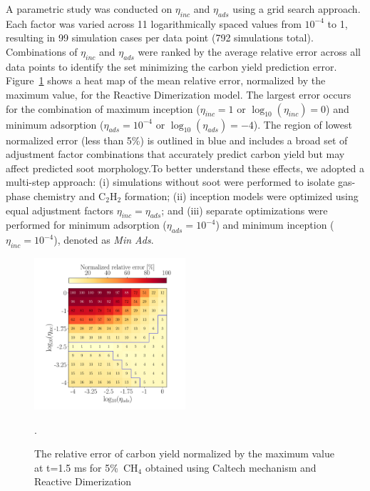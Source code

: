A parametric study was conducted on $\eta_{inc}$ and $\eta_{ads}$ using a grid search approach. Each factor was varied across 11 logarithmically spaced values from $10^{-4}$ to 1, resulting in 99 simulation cases per data point (792 simulations total). Combinations of $\eta_{inc}$ and $\eta_{ads}$ were ranked by the average relative error across all data points to identify the set minimizing the carbon yield prediction error. Figure~\ref{fig:shockagof_yielderror_cpr} shows a heat map of the mean relative error, normalized by the maximum value, for the Reactive Dimerization model. The largest error occurs for the combination of maximum inception ($\eta_{inc} = 1$ or $\log_{10}(\eta_{inc}) = 0$) and minimum adsorption ($\eta_{ads} = 10^{-4}$ or $\log_{10}(\eta_{ads}) = -4$). The region of lowest normalized error (less than 5\%) is outlined in blue and includes a broad set of adjustment factor combinations that accurately predict carbon yield but may affect predicted soot morphology.To better understand these effects, we adopted a multi-step approach: (i) simulations without soot were performed to isolate gas-phase chemistry and $\mathrm{C_2H_2}$ formation; (ii) inception models were optimized using equal adjustment factors $\eta_{inc} = \eta_{ads}$; and (iii) separate optimizations were performed for minimum adsorption ($\eta_{ads} = 10^{-4}$) and minimum inception ($\eta_{inc} = 10^{-4}$), denoted as \textit{Min Ads}.

\begin{figure}[H]
	\centering
	\includegraphics[width=0.5\textwidth]{Figures/Results/Shocktube/Agafonov2016_cpr/5CH4_norm_yield_error_readim.pdf}
	\caption{The relative error of carbon yield normalized by the maximum value at t=1.5 ms for 5\%~$\mathrm{CH_4}$ obtained using Caltech mechanism and Reactive Dimerization}.
	\label{fig:shockagof_yielderror_cpr} 
\end{figure}


